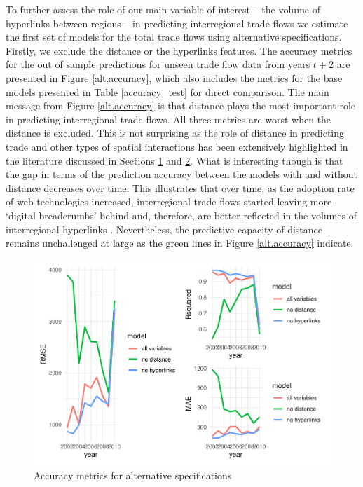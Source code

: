\documentclass[sigconf]{acmart}
\begin{document}
To further assess the role of our main variable of interest -- the
volume of hyperlinks between regions -- in predicting interregional
trade flows we estimate the first set of models for the total trade
flows using alternative specifications. Firstly, we exclude the distance
or the hyperlinks features. The accuracy metrics for the out of sample
predictions for unseen trade flow data from years \(t + 2\) are
presented in Figure \ref{alt.accuracy}, which also includes the metrics
for the base models presented in Table \ref{accuracy_test} for direct
comparison. The main message from Figure \ref{alt.accuracy} is that
distance plays the most important role in predicting interregional trade
flows. All three metrics are worst when the distance is excluded. This
is not surprising as the role of distance in predicting trade and other
types of spatial interactions has been extensively highlighted in the
literature discussed in Sections \protect\hyperlink{sec:1}{1} and
\protect\hyperlink{sec:2}{2}. What is interesting though is that the gap
in terms of the prediction accuracy between the models with and without
distance decreases over time. This illustrates that over time, as the
adoption rate of web technologies increased, interregional trade flows
started leaving more `digital breadcrumbs' behind and, therefore, are
better reflected in the volumes of interregional hyperlinks
\citep{rabari_storper2014}. Nevertheless, the predictive capacity of
distance remains unchallenged at large as the green lines in Figure
\ref{alt.accuracy} indicate.

\begin{figure}[p]
	\includegraphics[width=1\linewidth]{hl_files/figure-latex/unnamed-chunk-9-1} \caption{\label{alt.accuracy}Accuracy metrics for alternative specifications}\label{fig:unnamed-chunk-9}
\end{figure}
\end{document}
